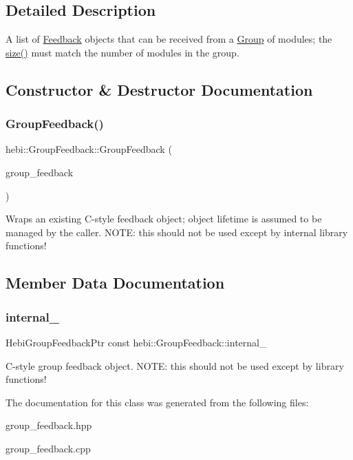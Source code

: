 \subsection{Detailed Description}
A list of \hyperlink{classhebi_1_1Feedback}{Feedback} objects that can be received from a \hyperlink{classhebi_1_1Group}{Group} of modules; the \hyperlink{classhebi_1_1GroupFeedback_a7509084e361feaf90d857d77afa4e4c0}{size()} must match the number of modules in the group. 

\subsection{Constructor \& Destructor Documentation}
\mbox{\label{classhebi_1_1GroupFeedback_ac12b1f1320eb14943d1b2600b0eecb1b}} 
\subsubsection{\texorpdfstring{Group\+Feedback()}{GroupFeedback()}}
{\footnotesize\ttfamily hebi\+::\+Group\+Feedback\+::\+Group\+Feedback (\begin{DoxyParamCaption}\item[{Hebi\+Group\+Feedback\+Ptr}]{group\+\_\+feedback }\end{DoxyParamCaption})}

Wraps an existing C-\/style feedback object; object lifetime is assumed to be managed by the caller. N\+O\+TE\+: this should not be used except by internal library functions! 

\subsection{Member Data Documentation}
\mbox{\label{classhebi_1_1GroupFeedback_ac549a7728905ca72e5a19256afaf9d49}} 
\subsubsection{\texorpdfstring{internal\+\_\+}{internal\_}}
{\footnotesize\ttfamily Hebi\+Group\+Feedback\+Ptr const hebi\+::\+Group\+Feedback\+::internal\+\_\+}

C-\/style group feedback object. N\+O\+TE\+: this should not be used except by library functions! 

The documentation for this class was generated from the following files\+:\begin{DoxyCompactItemize}
\item 
group\+\_\+feedback.\+hpp\item 
group\+\_\+feedback.\+cpp\end{DoxyCompactItemize}
